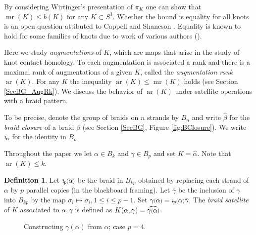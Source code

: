 \documentclass[11pt]{amsart}
\def\s{{\sigma}}
\def\ar{\operatorname{ar}}
\def\mr{\operatorname{mr}}
\newcommand*{\smallp}[1]{\scalebox{.75}{\ensuremath#1}}
\newcommand{\pp}[2][p]{\imath_{\hspace*{-1pt}#1}\hspace*{-.5pt}\smallp(#2\smallp)}
\theoremstyle{definition}
\newtheorem{defn}[thm]{Definition}
\begin{document}
By considering Wirtinger's presentation of $\pi_K$ one can show that $\mr(K)\le b(K)$ for any $K\subset S^3$. Whether the bound is equality for all knots is an open question attibuted to Cappell and Shaneson \cite[Prob. 1.11]{Kir95}. Equality is known to hold for some families of knots due to work of various authors (\cite{BZ,Cor13b,RZ}).

Here we study \emph{augmentations} of $K$, which are maps that arise in the study of knot contact homology. To each augmentation is associated a rank and there is a maximal rank of augmentations of a given $K$, called the \emph{augmentation rank} $\ar(K)$. For any $K$ the inequality $\ar(K)\le \mr(K)$ holds (see Section \ref{SecBG_AugRk}). We discuss the behavior of $\ar(K)$ under satellite operations with a braid pattern. 

To be precise, denote the group of braids on $n$ strands by $B_n$ and write $\hat{\beta}$ for the \emph{braid closure} of a braid $\beta$ (see Section \ref{SecBG}, Figure \ref{fig:BClosure}). We write $\imath_{\hspace*{-1pt}n}$ for the identity in $B_n$. 

Throughout the paper we let $\alpha\in B_k$ and $\gamma\in B_p$ and set $K = \hat{\alpha}$. Note that $\ar(K)\le k$.

\begin{defn} Let $\pp\alpha$ be the braid in $B_{kp}$ obtained by replacing each strand of $\alpha$ by $p$ parallel copies (in the blackboard framing). Let $\bar\gamma$ be the inclusion of $\gamma$ into $B_{kp}$ by the map $\s_i\mapsto\s_i, 1\le i\le p-1$. Set $\gamma\smallp(\alpha\smallp) = \pp\alpha\bar\gamma$. The \emph{braid satellite} of $K$ associated to $\alpha, \gamma$ is defined as $K(\alpha,\gamma) = \widehat{\gamma\smallp(\alpha\smallp)}$.
\label{defn:BraidSat}
\end{defn}

\begin{figure}[ht]
  \caption{Constructing $\gamma(\alpha)$ from $\alpha$; case $p=4$.}
  \label{FigBraidSat}
  \end{figure}
\end{document}
